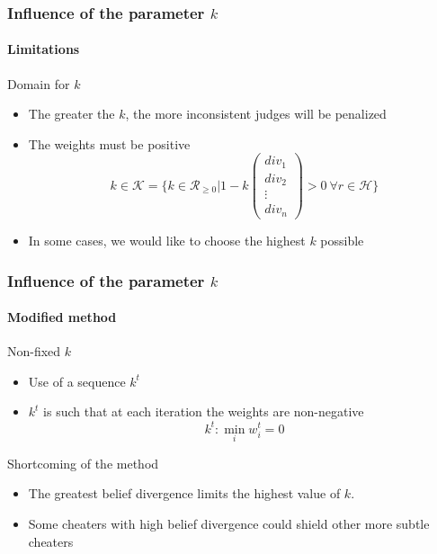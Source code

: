 \begin{frame}
\frametitle{Influence of the parameter $k$}
\framesubtitle{Limitations}
\begin{block}{Domain for $k$}
\begin{itemize}
\item The greater the $k$, the more inconsistent judges will be penalized
\item The weights must be positive
$$k\in \mathcal{K} = \{k\in \mathcal{R}_{\geq 0} | 1 - k \begin{pmatrix} div_1 \\ div_2 \\ \vdots \\ div_n \end{pmatrix} >0 \: \forall r \in \mathcal{H} \}$$
\item In some cases, we would like to choose the highest $k$ possible
\end{itemize}
\end{block}

\end{frame}

\begin{frame}
\frametitle{Influence of the parameter $k$}
\framesubtitle{Modified method}
\begin{block}{Non-fixed $k$}
\begin{itemize}
\item Use of a sequence $k^t$
\item $k^t$ is such that at each iteration the weights are non-negative
$$ k^t : \min_i w_i^t = 0$$
\end{itemize}
\end{block}
\begin{block}{Shortcoming of the method}
\begin{itemize}
\item The greatest belief divergence limits the highest value of $k$.
\item Some cheaters with high belief divergence could shield other more subtle cheaters
\end{itemize}
\end{block}
\end{frame}


